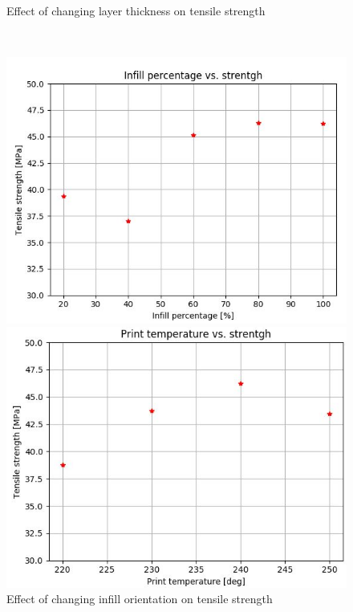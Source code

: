 \documentclass[a4paper, 11pt, reqno]{report}
\begin{document}
\begin{figure}[h]
\begin{minipage}[b]{0.48\textwidth}
  \end{minipage}
  \\[1pt]
  \begin{minipage}[t]{0.48\textwidth}
    \caption{Effect of changing layer thickness on tensile strength}
  \end{minipage}
  \hfill
  \begin{minipage}[t]{0.48\textwidth}
    \caption{Effect of changing infill orientation on tensile strength}
  \end{minipage}
  \\[10pt]
 \begin{minipage}[b]{0.48\textwidth}
    \includegraphics[width=\textwidth]{Graf2-2}
  \end{minipage}
  \hfill
  \begin{minipage}[b]{0.48\textwidth}
    \includegraphics[width=\textwidth]{Graf4-2}

\end{minipage}
\end{figure}
\end{document}
